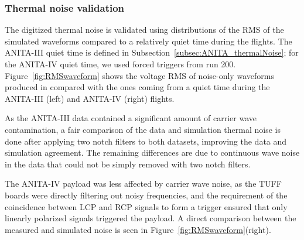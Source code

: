 \subsubsection{Thermal noise validation}
\label{subsec:ANITA_validation_thermalNoise}
The digitized thermal noise is validated using distributions of
the RMS of the simulated waveforms compared to a relatively quiet time
during the flights.
The ANITA-III quiet time is defined in Subsection~\ref{subsec:ANITA_thermalNoise}; for the ANITA-IV quiet time, we used forced triggers from run 200.
Figure~\ref{fig:RMSwaveform} shows the voltage RMS of noise-only waveforms produced
in \icemc compared with the ones coming from a quiet time during
the ANITA-III (left) and ANITA-IV (right) flights.

As the ANITA-III data contained a significant amount of carrier wave
contamination, a fair comparison of the data and simulation thermal noise is done after applying two notch filters to both datasets, improving the data and simulation agreement.
The remaining differences are due to continuous wave noise in the data that
could not be simply removed with two notch filters.

The ANITA-IV payload was less affected by carrier wave noise, as the TUFF boards were directly filtering out noisy frequencies, and the requirement of the coincidence between LCP and RCP signals to form a trigger ensured that only linearly polarized signals triggered the payload.
A direct comparison between the measured and simulated noise is seen in Figure~\ref{fig:RMSwaveform}(right). 

